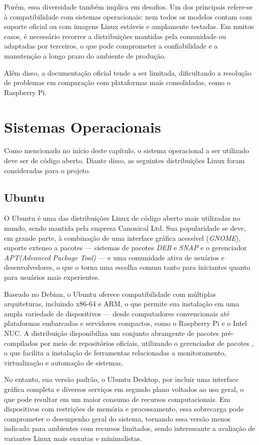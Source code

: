 Porém, essa diversidade também implica em desafios. Um dos principais refere-se à compatibilidade com sistemas operacionais: nem todos os modelos contam com suporte oficial ou com imagens Linux estáveis e amplamente testadas. Em muitos casos, é necessário recorrer a distribuições mantidas pela comunidade ou adaptadas por terceiros, o que pode comprometer a confiabilidade e a manutenção a longo prazo do ambiente de produção.

Além disso, a documentação oficial tende a ser limitada, dificultando a resolução de problemas em comparação com plataformas mais consolidadas, como o Raspberry Pi.


\section{Sistemas Operacionais}
\label{section:SistemasOperacionais}

Como mencionado no início deste capítulo, o sistema operacional a ser utilizado deve ser de código aberto. Diante disso, as seguintes distribuições Linux foram consideradas para o projeto.

\subsection{Ubuntu}
\label{subsection:Ubuntu}

O Ubuntu é uma das distribuições Linux de código aberto mais utilizadas no mundo, sendo mantida pela empresa Canonical Ltd. Sua popularidade se deve, em grande parte, à combinação de uma interface gráfica acessível (\textit{GNOME}), suporte extenso a pacotes --- sistemas de pacotes \textit{DEB} e \textit{SNAP} e o gerenciador \textit{APT(Advanced Package Tool)} ---  e uma comunidade ativa de usuários e desenvolvedores, o que o torna uma escolha comum tanto para iniciantes quanto para usuários mais experientes.

Baseado no Debian, o Ubuntu oferece compatibilidade com múltiplas arquiteturas, incluindo x86-64 e ARM, o que permite sua instalação em uma ampla variedade de dispositivos — desde computadores convencionais até plataformas embarcadas e servidores compactos, como o Raspberry Pi e o Intel NUC. A distribuição disponibiliza um conjunto abrangente de pacotes pré-compilados por meio de repositórios oficiais, utilizando o gerenciador de pacotes , o que facilita a instalação de ferramentas relacionadas a monitoramento, virtualização e automação de sistemas.

No entanto, sua versão padrão, o Ubuntu Desktop, por incluir uma interface gráfica completa e diversos serviços em segundo plano voltados ao uso geral, o que pode resultar em um maior consumo de recursos computacionais. Em dispositivos com restrições de memória e processamento, essa sobrecarga pode comprometer o desempenho geral do sistema, tornando essa versão menos indicada para ambientes com recursos limitados, sendo interessante a avaliação de variantes Linux mais enxutas e minimalistas.

